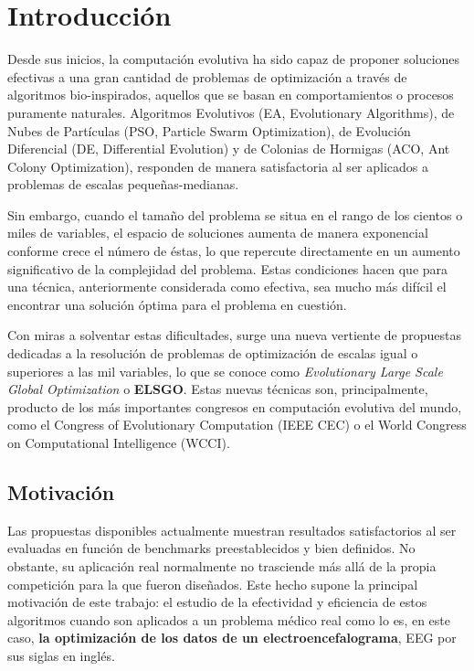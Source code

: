 \chapter{Introducción}

Desde sus inicios, la computación evolutiva ha sido capaz de proponer soluciones efectivas a una gran cantidad de problemas de optimización a través de algoritmos bio-inspirados, aquellos que se basan en comportamientos o procesos puramente naturales. Algoritmos Evolutivos (EA, Evolutionary Algorithms), de Nubes de Partículas (PSO, Particle Swarm Optimization), de Evolución Diferencial (DE, Differential Evolution) y de Colonias de Hormigas (ACO, Ant Colony Optimization), responden de manera satisfactoria al ser aplicados a problemas de escalas pequeñas-medianas.

Sin embargo, cuando el tamaño del problema se situa en el rango de los cientos o miles de variables, el espacio de soluciones aumenta de manera exponencial conforme crece el número de éstas, lo que repercute directamente en un aumento significativo de la complejidad del problema. Estas condiciones hacen que para una técnica, anteriormente considerada como efectiva, sea mucho más difícil el encontrar una solución óptima para el problema en cuestión.

Con miras a solventar estas dificultades, surge una nueva vertiente de propuestas dedicadas a la resolución de problemas de optimización de escalas igual o superiores a las mil variables, lo que se conoce como\textit{ Evolutionary Large Scale Global Optimization} o \textbf{ELSGO}\cite{ELSGOI}. Estas nuevas técnicas son, principalmente, producto de los más importantes congresos en computación evolutiva del mundo, como el Congress of Evolutionary Computation (IEEE CEC) o el World Congress on Computational Intelligence (WCCI).

\section{Motivación}

Las propuestas disponibles actualmente muestran resultados satisfactorios al ser evaluadas en función de benchmarks preestablecidos y bien definidos. No obstante, su aplicación real normalmente no trasciende más allá de la propia competición para la que fueron diseñados. Este hecho supone la principal motivación de este trabajo: el estudio de la efectividad y eficiencia de estos algoritmos cuando son aplicados a un problema médico real como lo es, en este caso, \textbf{la optimización de los datos de un electroencefalograma}, EEG por sus siglas en inglés.

